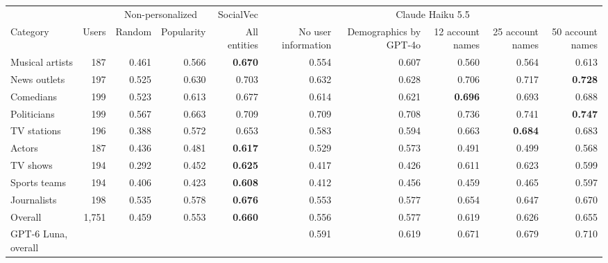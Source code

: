 \begin{tabular}{lrrrrrrrrr}
\toprule
 &  & \multicolumn{2}{c}{Non-personalized} & SocialVec & \multicolumn{5}{c}{Claude Haiku 5.5} \\
Category & Users & Random & Popularity & All entities & No user information & Demographics by GPT-4o & 12 account names & 25 account names & 50 account names \\
\midrule
Musical artists & 187 & 0.461 & 0.566 & \textbf{0.670} & 0.554 & 0.607 & 0.560 & 0.564 & 0.613 \\
News outlets & 197 & 0.525 & 0.630 & 0.703 & 0.632 & 0.628 & 0.706 & 0.717 & \textbf{0.728} \\
Comedians & 199 & 0.523 & 0.613 & 0.677 & 0.614 & 0.621 & \textbf{0.696} & 0.693 & 0.688 \\
Politicians & 199 & 0.567 & 0.663 & 0.709 & 0.709 & 0.708 & 0.736 & 0.741 & \textbf{0.747} \\
TV stations & 196 & 0.388 & 0.572 & 0.653 & 0.583 & 0.594 & 0.663 & \textbf{0.684} & 0.683 \\
Actors & 187 & 0.436 & 0.481 & \textbf{0.617} & 0.529 & 0.573 & 0.491 & 0.499 & 0.568 \\
TV shows & 194 & 0.292 & 0.452 & \textbf{0.625} & 0.417 & 0.426 & 0.611 & 0.623 & 0.599 \\
Sports teams & 194 & 0.406 & 0.423 & \textbf{0.608} & 0.412 & 0.456 & 0.459 & 0.465 & 0.597 \\
Journalists & 198 & 0.535 & 0.578 & \textbf{0.676} & 0.553 & 0.577 & 0.654 & 0.647 & 0.670 \\
\midrule
Overall & 1,751 & 0.459 & 0.553 & \textbf{0.660} & 0.556 & 0.577 & 0.619 & 0.626 & 0.655 \\
GPT-6 Luna, overall &  &  &  &  & 0.591 & 0.619 & 0.671 & 0.679 & 0.710 \\
\bottomrule
\end{tabular}
